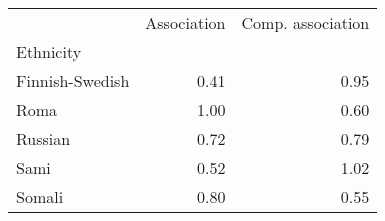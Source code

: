 \begin{tabular}{lrr}
\toprule
{} &  Association &  Comp. association \\
Ethnicity       &              &                    \\
\midrule
Finnish-Swedish &         0.41 &               0.95 \\
Roma            &         1.00 &               0.60 \\
Russian         &         0.72 &               0.79 \\
Sami            &         0.52 &               1.02 \\
Somali          &         0.80 &               0.55 \\
\bottomrule
\end{tabular}
